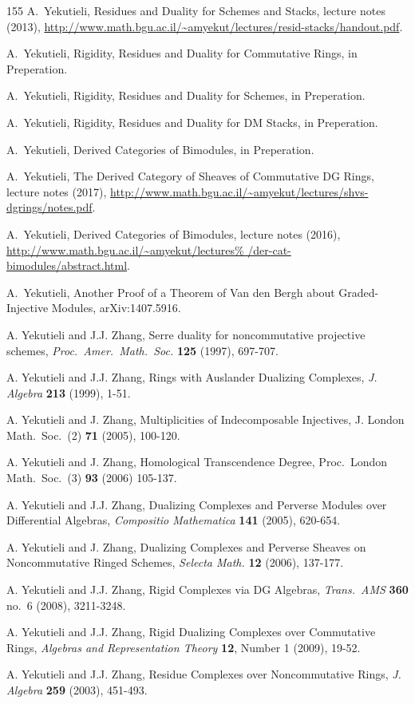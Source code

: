 \begin{thebibliography}{155}
 A.\ Yekutieli,
Residues and Duality for Schemes and Stacks,
lecture notes (2013),
\url{http://www.math.bgu.ac.il/~amyekut/lectures/resid-stacks/handout.pdf}.

 A.\ Yekutieli,   
Rigidity, Residues and Duality for Commutative Rings, in Preperation. 

 A.\ Yekutieli,
Rigidity, Residues and Duality for Schemes, in Preperation. 

 A.\ Yekutieli,
Rigidity, Residues and Duality for DM Stacks, in Preperation.

 A.\ Yekutieli,
Derived Categories of Bimodules,  in Preperation. 

 A.\ Yekutieli,
The Derived Category of Sheaves of Commutative DG Rings, 
lecture notes (2017),
\url{http://www.math.bgu.ac.il/~amyekut/lectures/shvs-dgrings/notes.pdf}.

 A.\ Yekutieli,
Derived Categories of Bimodules, lecture notes (2016),
\url{http://www.math.bgu.ac.il/~amyekut/lectures%
/der-cat-bimodules/abstract.html}.

 A.\ Yekutieli,
Another Proof of a Theorem of Van den Bergh about Graded-Injective 
Modules, arXiv:1407.5916. 

 A. Yekutieli and J.J. Zhang,
Serre duality for noncommutative projective schemes,
{\em Proc.\ Amer.\ Math.\ Soc.} {\bf 125} (1997), 697-707.

 A. Yekutieli and J.J. Zhang,
Rings with Auslander Dualizing Complexes,
{\em J. Algebra} {\bf 213} (1999), 1-51. 

  A. Yekutieli and J. Zhang,
Multiplicities of Indecomposable Injectives,
J. London Math.\ Soc.\ (2) {\bf 71} (2005), 100-120.

  A. Yekutieli and J. Zhang,
Homological Transcendence Degree,
Proc.\ London Math.\ Soc.\ (3) {\bf 93} (2006) 105-137.

 A. Yekutieli and J.J. Zhang,
Dualizing Complexes and Perverse Modules over Differential Algebras,
{\em Compositio Mathematica} {\bf 141} (2005), 620-654. 

 A. Yekutieli and J. Zhang,
Dualizing Complexes and Perverse Sheaves on Noncommutative Ringed Schemes,
{\em Selecta Math.} {\bf 12} (2006), 137-177.

 A. Yekutieli and J.J. Zhang,
Rigid Complexes via DG Algebras,
{\em Trans.\ AMS} {\bf 360} no.\ 6 (2008), 3211-3248.

 A. Yekutieli and J.J. Zhang,
Rigid Dualizing Complexes over Commutative Rings,
{\em Algebras and Representation Theory} {\bf 12}, Number 1 (2009), 19-52.

 A. Yekutieli and J.J. Zhang,
Residue Complexes over Noncommutative Rings,
{\em J. Algebra} {\bf 259} (2003), 451-493. 

\end{thebibliography}


